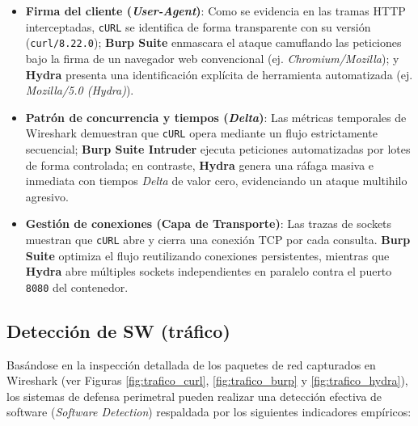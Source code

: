\documentclass[letter,12pt]{article}
\begin{document}
\begin{itemize}
    \item \textbf{Firma del cliente (\textit{User-Agent})}: Como se evidencia en las tramas HTTP interceptadas, \texttt{cURL} se identifica de forma transparente con su versión (\texttt{curl/8.22.0}); \textbf{Burp Suite} enmascara el ataque camuflando las peticiones bajo la firma de un navegador web convencional (ej. \textit{Chromium/Mozilla}); y \textbf{Hydra} presenta una identificación explícita de herramienta automatizada (ej. \textit{Mozilla/5.0 (Hydra)}).
    \item \textbf{Patrón de concurrencia y tiempos (\textit{Delta})}: Las métricas temporales de Wireshark demuestran que \texttt{cURL} opera mediante un flujo estrictamente secuencial; \textbf{Burp Suite Intruder} ejecuta peticiones automatizadas por lotes de forma controlada; en contraste, \textbf{Hydra} genera una ráfaga masiva e inmediata con tiempos \textit{Delta} de valor cero, evidenciando un ataque multihilo agresivo.
    \item \textbf{Gestión de conexiones (Capa de Transporte)}: Las trazas de sockets muestran que \texttt{cURL} abre y cierra una conexión TCP por cada consulta. \textbf{Burp Suite} optimiza el flujo reutilizando conexiones persistentes, mientras que \textbf{Hydra} abre múltiples sockets independientes en paralelo contra el puerto \texttt{8080} del contenedor.
\end{itemize}

\subsection{Detección de SW (tráfico)}

Basándose en la inspección detallada de los paquetes de red capturados en Wireshark (ver Figuras \ref{fig:trafico_curl}, \ref{fig:trafico_burp} y \ref{fig:trafico_hydra}), los sistemas de defensa perimetral pueden realizar una detección efectiva de software (\textit{Software Detection}) respaldada por los siguientes indicadores empíricos:
\end{document}
